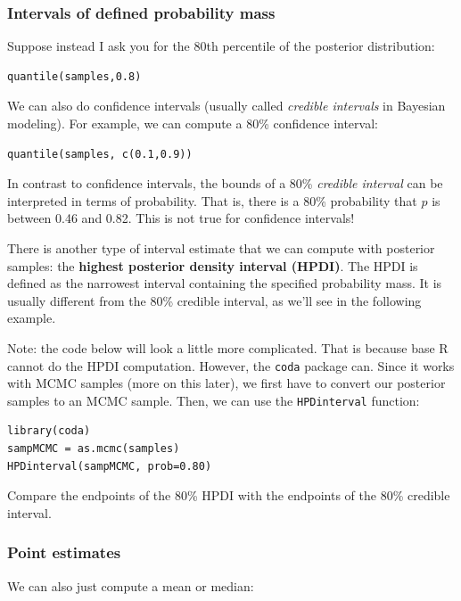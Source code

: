\documentclass[11pt]{article}
\begin{document}
\subsubsection*{Intervals of defined probability mass}
\label{sec-6-3-2}

Suppose instead I ask you for the 80th percentile of the posterior distribution:

\begin{verbatim}
quantile(samples,0.8)
\end{verbatim}

We can also do confidence intervals (usually called \emph{credible intervals} in Bayesian modeling).  For example, we can compute a 80\% confidence interval:

\begin{verbatim}
quantile(samples, c(0.1,0.9))
\end{verbatim}

In contrast to confidence intervals, the bounds of a 80\% \emph{credible interval} can be interpreted in terms of probability.  That is, there is a 80\% probability that $p$ is between 0.46 and 0.82.  This is not true for confidence intervals!

There is another type of interval estimate that we can compute with posterior samples: the \textbf{highest posterior density interval (HPDI)}.  The HPDI is defined as the narrowest interval containing the specified probability mass.  It is usually different from the 80\% credible interval, as we'll see in the following example.

Note: the code below will look a little more complicated.  That is because base R cannot do the HPDI computation.  However, the \texttt{coda} package can.  Since it works with MCMC samples (more on this later), we first have to convert our posterior samples to an MCMC sample.  Then, we can use the \texttt{HPDinterval} function:

\begin{verbatim}
library(coda)
sampMCMC = as.mcmc(samples)
HPDinterval(sampMCMC, prob=0.80)
\end{verbatim}

Compare the endpoints of the 80\% HPDI with the endpoints of the 80\% credible interval.

\subsubsection*{Point estimates}
\label{sec-6-3-3}
We can also just compute a mean or median:
\end{document}
